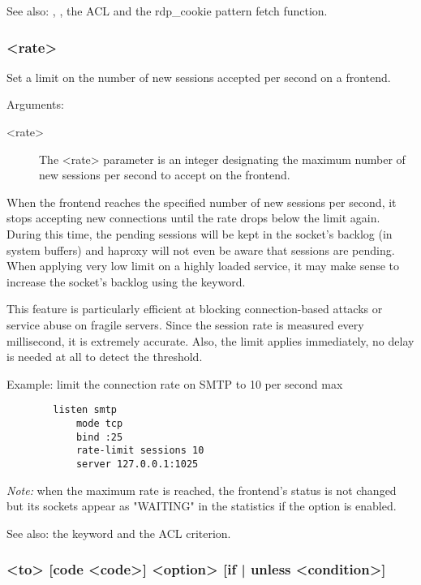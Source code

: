 See also: , , the  ACL and
  the rdp\_cookie pattern fetch function.

\subsubsection[rate-limit sessions]{ <rate>}

  Set a limit on the number of new sessions accepted per second on a frontend.


  Arguments:
  \begin{description}
  \item[<rate>] The <rate> parameter is an integer designating the maximum number
              of new sessions per second to accept on the frontend.
  \end{description}
  
  When the frontend reaches the specified number of new sessions per second, it
  stops accepting new connections until the rate drops below the limit again.
  During this time, the pending sessions will be kept in the socket's backlog
  (in system buffers) and haproxy will not even be aware that sessions are
  pending. When applying very low limit on a highly loaded service, it may make
  sense to increase the socket's backlog using the  keyword.

  This feature is particularly efficient at blocking connection-based attacks
  or service abuse on fragile servers. Since the session rate is measured every
  millisecond, it is extremely accurate. Also, the limit applies immediately,
  no delay is needed at all to detect the threshold.

  Example: limit the connection rate on SMTP to 10 per second max
  \begin{verbatim} 
        listen smtp
            mode tcp
            bind :25
            rate-limit sessions 10
            server 127.0.0.1:1025
  \end{verbatim}

  \emph{Note:} when the maximum rate is reached, the frontend's status is not changed
         but its sockets appear as "WAITING" in the statistics if the
          option is enabled.

See also: the  keyword and the  ACL criterion.

\subsubsection[redirect location] { <to> [code <code>] <option> [{if | unless} <condition>]}
